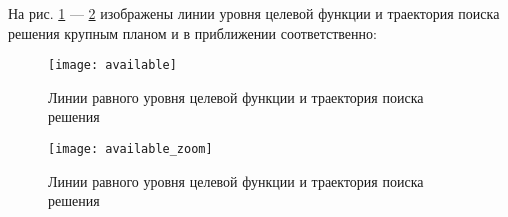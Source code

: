 На рис. \ref{pic:available} --- \ref{pic:available-zoom} изображены линии уровня целевой функции и траектория поиска решения крупным планом и в приближении соответственно:

\begin{figure}[H]
\begin{center}
	\texttt{[image: available]}
	\caption{Линии равного уровня целевой функции и траектория поиска решения}
	\label{pic:available}
\end{center}
\end{figure}

\begin{figure}[H]
\begin{center}
	\texttt{[image: available\_zoom]}
	\caption{Линии равного уровня целевой функции и траектория поиска решения}
	\label{pic:available-zoom}
\end{center}
\end{figure}

